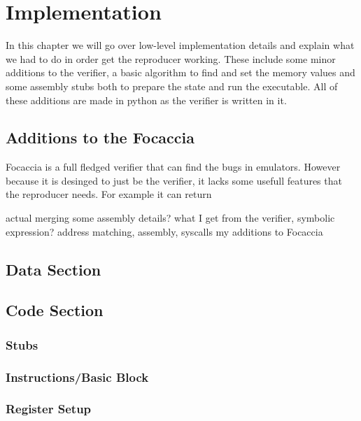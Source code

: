 
\chapter{Implementation}\label{chapter:implementation}
In this chapter we will go over low-level implementation details and explain what we had to do in order get the reproducer working.
These include some minor additions to the verifier, a basic algorithm to find and set the memory values and some assembly stubs both to prepare the state and run the executable.
All of these additions are made in python as the verifier is written in it.

\section{Additions to the Focaccia}
Focaccia is a full fledged verifier that can find the bugs in emulators.
However because it is desinged to just be the verifier, it lacks some usefull features that the reproducer needs.
For example it can return 

actual merging some assembly details?
what I get from the verifier, symbolic expression?
address matching, assembly, syscalls
my additions to Focaccia

\section{Data Section}
\section{Code Section}
\subsection{Stubs}
\subsection{Instructions/Basic Block}
\subsection{Register Setup}